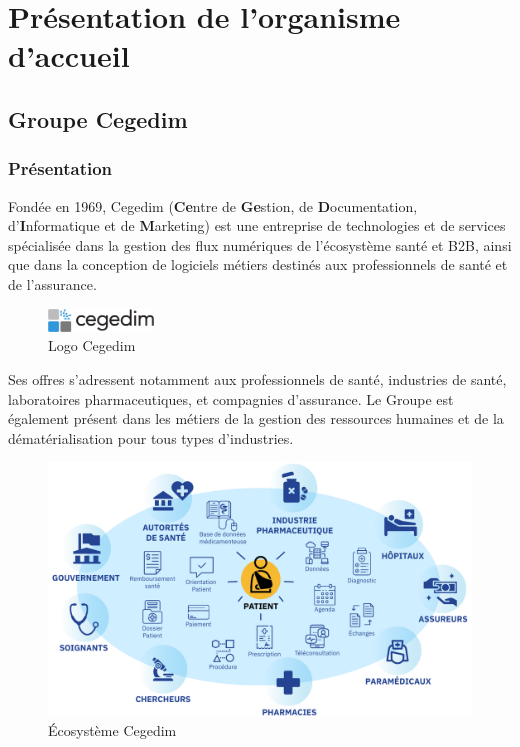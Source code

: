 \section{Présentation de l'organisme d'accueil}
\label{sec:presentation}
\subsection{Groupe Cegedim}
\subsubsection{Présentation}
Fondée en 1969, Cegedim (\textbf{Ce}ntre de \textbf{Ge}stion, de \textbf{D}ocumentation, d’\textbf{I}nformatique et de \textbf{M}arketing) est une entreprise de technologies et de services spécialisée dans la gestion des flux numériques de l’écosystème santé et B2B, ainsi que dans la conception de logiciels métiers destinés aux professionnels de santé et de l’assurance.\\

\begin{figure}[H]
    \centering
    \includegraphics[width=0.25\textwidth]{images/sec1/cegedim-logo.pdf}
    \caption{Logo Cegedim}
\end{figure}

Ses offres s’adressent notamment aux professionnels de santé, industries de santé, laboratoires pharmaceutiques, et compagnies d’assurance. Le Groupe est également présent dans les métiers de la gestion des ressources humaines et de la dématérialisation pour tous types d’industries.
\begin{figure}[H]
    \centering
    \includegraphics[width=\textwidth]{images/sec1/cegedim-ecosystem.pdf}
    \caption{Écosystème Cegedim}
\end{figure}
